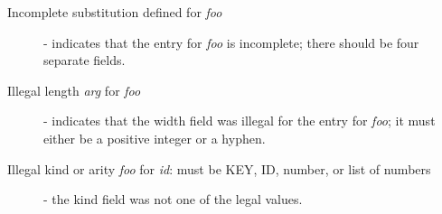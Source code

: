 \begin{description}

\item[Incomplete substitution defined for \emph{foo}] - indicates that the
entry for \emph{foo} is incomplete; there should be four separate fields.

\item[Illegal length \emph{arg} for \emph{foo}] - indicates that the width
field was illegal for the entry for \emph{foo}; it must either be a
positive integer or a hyphen.

\item[Illegal kind or arity \emph{foo} for \emph{id}: must be KEY, ID,
number, or list of numbers] - the kind field was not one of the legal
values.

\end{description}
